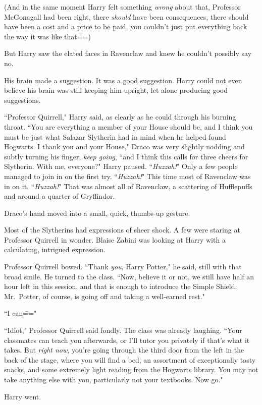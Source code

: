(And in the same moment Harry felt something \emph{wrong} about that, Professor McGonagall had been right, there \emph{should} have been consequences, there should have been a cost and a price to be paid, you couldn't just put everything back the way it was like that\===)

But Harry saw the elated faces in Ravenclaw and knew he couldn't possibly say no.

His brain made a suggestion. It was a good suggestion. Harry could not even believe his brain was still keeping him upright, let alone producing good suggestions.

``Professor Quirrell," Harry said, as clearly as he could through his burning throat. ``You are everything a member of your House should be, and I think you must be just what Salazar Slytherin had in mind when he helped found Hogwarts. I thank you and your House," Draco was very slightly nodding and subtly turning his finger, \emph{keep going}, ``and I think this calls for three cheers for Slytherin. With me, everyone?" Harry paused. ``\emph{Huzzah!}" Only a few people managed to join in on the first try. ``\emph{Huzzah!}" This time most of Ravenclaw was in on it. ``\emph{Huzzah!}" That was almost all of Ravenclaw, a scattering of Hufflepuffs and around a quarter of Gryffindor.

Draco's hand moved into a small, quick, thumbs-up gesture.

Most of the Slytherins had expressions of sheer shock. A few were staring at Professor Quirrell in wonder. Blaise Zabini was looking at Harry with a calculating, intrigued expression.

Professor Quirrell bowed. ``Thank \emph{you}, Harry Potter," he said, still with that broad smile. He turned to the class. ``Now, believe it or not, we still have half an hour left in this session, and that is enough to introduce the Simple Shield. Mr.~Potter, of course, is going off and taking a well-earned rest."

``I can\==="

``Idiot," Professor Quirrell said fondly. The class was already laughing. ``Your classmates can teach you afterwards, or I'll tutor you privately if that's what it takes. But \emph{right now}, you're going through the third door from the left in the back of the stage, where you will find a bed, an assortment of exceptionally tasty snacks, and some extremely light reading from the Hogwarts library. You may not take anything else with you, particularly not your textbooks. Now go."

Harry went.

